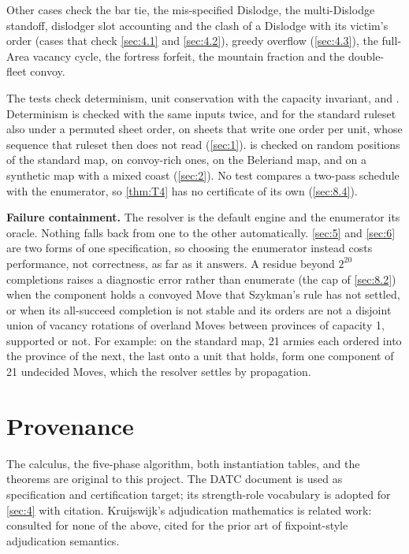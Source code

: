 \documentclass[12pt,a4paper]{article}
\begin{document}
\begin{description}[style=nextline]
Other cases check the bar tie, the mis-specified Dislodge, the multi-Dislodge standoff, dislodger slot accounting and the clash of a Dislodge with its victim's order (cases that check \cref{sec:4.1} and \cref{sec:4.2}), greedy overflow (\cref{sec:4.3}), the full-Area vacancy cycle, the fortress forfeit, the mountain fraction and the double-fleet convoy.
\item[\code{tests/properties/} -- the \cref{thm:T2}/\cref{thm:T3} certificates]
The tests check determinism, unit conservation with the capacity invariant, and .
Determinism is checked with the same inputs twice, and for the standard ruleset also under a permuted sheet order, on sheets that write one order per unit, whose sequence that ruleset then does not read (\cref{sec:1}).
 is checked on random positions of the standard map, on convoy-rich ones, on the Beleriand map, and on a synthetic map with a mixed coast (\cref{sec:2}).
No test compares a two-pass schedule with the enumerator, so \cref{thm:T4} has no certificate of its own (\cref{sec:8.4}).
\end{description}

\textbf{Failure containment.}
The resolver is the default engine and the enumerator its oracle.
Nothing falls back from one to the other automatically.
\cref{sec:5} and \cref{sec:6} are two forms of one specification, so choosing the enumerator instead costs performance, not correctness, as far as it answers.
A residue beyond $2^{20}$ completions raises a diagnostic error rather than enumerate (the cap of \cref{sec:8.2}) when the component holds a convoyed Move that Szykman's rule has not settled, or when its all-succeed completion is not stable and its orders are not a disjoint union of vacancy rotations of overland Moves between provinces of capacity 1, supported or not.
For example: on the standard map, 21 armies each ordered into the province of the next, the last onto a unit that holds, form one component of 21 undecided Moves, which the resolver settles by propagation.

\section*{Provenance}

The calculus, the five-phase algorithm, both instantiation tables, and the theorems are original to this project.
The DATC document is used as specification and certification target; its strength-role vocabulary is adopted for \cref{sec:4} with citation.
Kruijswijk's adjudication mathematics is related work: consulted for none of the above, cited for the prior art of fixpoint-style adjudication semantics.
\end{document}
